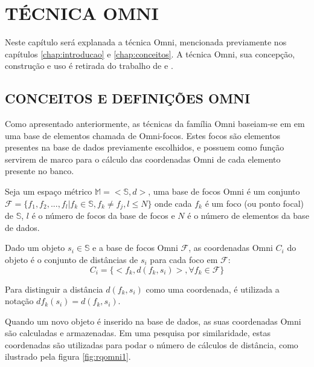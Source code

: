 \chapter{TÉCNICA OMNI}
\label{chap:omni}

Neste capítulo será explanada a técnica Omni, mencionada previamente nos capítulos \ref{chap:introducao} e \ref{chap:conceitos}.
A técnica Omni, sua concepção, construção e uso é retirada do trabalho de \cite{Traina2001} e \cite{Traina2007}.

\section{CONCEITOS E DEFINIÇÕES OMNI}
\label{sec:defomni}
Como apresentado anteriormente, as técnicas da família Omni baseiam-se em em uma base de elementos chamada de 
Omni-focos. Estes focos são elementos presentes na base de dados previamente escolhidos, e possuem como função 
servirem de marco para o cálculo das coordenadas Omni de cada elemento presente no banco.

\begin{mydef}
 \label{def:omnifoco}
 Seja um espaço métrico $\mathbb{M} = <\mathbb{S},d>$, uma base de focos Omni é um conjunto 
 $\mathscr{F} = \{f_1, f_2, ..., f_l | f_k \in \mathbb{S}, f_k \neq f_j, l \leq N \}$ onde cada $f_k$ é um foco
 (ou ponto focal) de $\mathbb{S}$, $l$ é o número de focos da base de focos e $N$ é o número de elementos da base de dados.
\end{mydef}

\begin {mydef}
 \label{def:omnicoord}
 Dado um objeto $s_i \in \mathbb{S}$ e a base de focos Omni $\mathscr{F}$, as coordenadas Omni $C_i$ do objeto é o conjunto
 de distâncias de $s_i$ para cada foco em $\mathscr{F}$:
 \begin{equation}
  C_i = \{ <f_k, d(f_k, s_i)>, \forall f_k \in \mathscr{F} \}
 \end{equation}
\end {mydef}

Para distinguir a distância $d(f_k, s_i)$ como uma coordenada, é utilizada a notação $df_k(s_i) = d(f_k, s_i)$.\par
Quando um novo objeto é inserido na base de dados, as suas coordenadas Omni são calculadas e armazenadas. Em uma pesquisa por
similaridade, estas coordenadas são utilizadas para podar o número de cálculos de distância, como ilustrado pela figura \ref{fig:rqomni1}.\par

